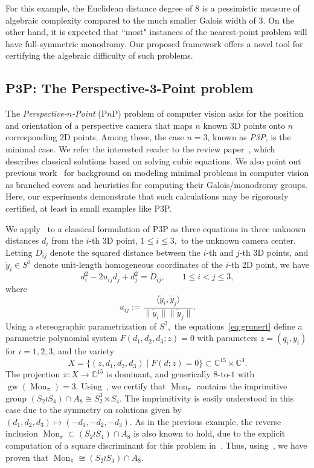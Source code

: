 \documentclass[11pt]{amsart}
\let\oldtextit\textit
\renewcommand\emph[1]{\oldtextit{\color{blue}#1}}
\theoremstyle{definition}
\theoremstyle{remark}
\DeclareMathOperator{\Mon}{Mon}
\DeclareMathOperator{\gw}{gw}
\begin{document}
For this example, the Euclidean distance degree of $8$ is a pessimistic measure of algebraic complexity compared to the much smaller Galois width of $3.$
On the other hand, it is expected that ``most" instances of the nearest-point problem will have full-symmetric monodromy. 
Our proposed framework offers a novel tool for certifying the algebraic difficulty of such problems.

\subsection{P3P: The Perspective-3-Point problem}\label{subsec:p3p}

The \emph{Perspective-$n$-Point} (P$n$P) problem of computer vision asks for the position and orientation of a perspective camera
that maps $n$ known 3D points onto $n$ corresponding 2D points. Among these, the case $n=3$, known as \emph{P3P}, is the minimal case.
We refer the interested reader to the review paper~\cite{haralick1994review}, which describes classical solutions based on solving cubic equations.
We also point out previous work~\cite{duff2022galois} for background on modeling minimal problems in computer vision as branched covers and heuristics for computing their Galois/monodromy groups. 
Here, our experiments demonstrate that such calculations may be rigorously certified, at least in small examples like P3P.


We apply~ to a classical formulation of P3P as three equations in three unknown distances $d_i$ from the $i$-th 3D point, $1 \le i \le 3 ,$ to the unknown camera center. 
Letting $D_{ij}$ denote the squared distance between the $i$-th and $j$-th 3D points, and $\tilde{y}_i \in S^2$ denote unit-length homogeneous coordinates of the $i$-th 2D point, we have 
\begin{equation}\label{eq:grunert}
d_i^2 - 2 u_{ij} d_j + d_j^2 = D_{ij}, \qquad 1 \le i < j \le 3,
\end{equation}
where
\[
u_{ij} := \frac{\langle \tilde y_i , \tilde y_j \rangle}{\|\tilde y_i\| \|\tilde y_j\|}.
\]
Using a stereographic parametrization of $S^2,$ the equations~\eqref{eq:grunert} define a parametric polynomial system $F(d_1,d_2,d_3; z) = 0$ with parameters $z = (q_i, y_i)$ for $i=1,2,3$, and the variety
\[
X = \{(z,d_1,d_2,d_3) \mid F(d;z)=0\} \subset \mathbb{C}^{15} \times \mathbb{C}^3.
\]
The projection $\pi : X \to \mathbb{C}^{15}$ is dominant, and generically $8$-to-$1$ with $\gw (\Mon_\pi) = 3.$
Using~, we certify that $\Mon_\pi$ contains the imprimitive group $(S_2 \wr S_4) \cap A_8 \cong S_2^3 \rtimes  S_4$.
The imprimitivity is easily understood in this case due to the symmetry on solutions given by $(d_1,d_2,d_3) \mapsto (-d_1, - d_2, -d_3).$
As in the previous example, the reverse inclusion $\Mon_\pi \subset (S_2 \wr S_4) \cap A_8 $ is also known to hold, due to the explicit computation of a square discriminant for this problem in~\cite[\S 3]{duff2022galois}.
Thus, using~, we have proven that $\Mon_\pi \cong (S_2 \wr S_4) \cap A_8.$
\end{document}
